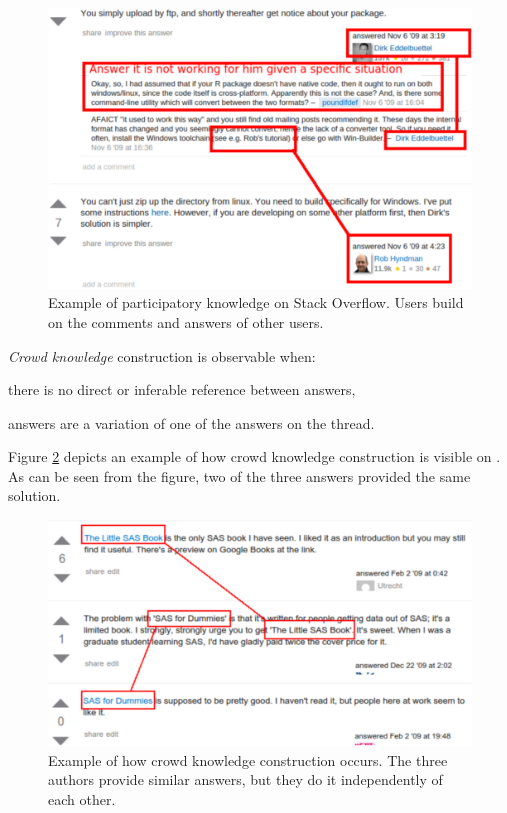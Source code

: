     \begin{figure}[!htb]
        \centering
        \includegraphics[width=\columnwidth]{Figures/SO-PKimg5}
        \caption{Example of participatory knowledge on Stack Overflow. Users build on the comments and answers of other users.}
        \label{fig:SO-PK1}
        \vspace{-3mm}
    \end{figure}

\textit{Crowd knowledge} construction is observable when:
  \begin{enumerate*}[label=(\arabic*)]
    \item there is no direct or inferable reference between answers,
    \item answers are a variation of one of the answers on the thread.
  \end{enumerate*}
Figure \ref{fig:CKC_MLSO} depicts an example of how crowd knowledge construction is visible on \SO. As can be seen from the figure, two of the three answers provided the same solution. 

    \begin{figure} [!htb]
        \centering
        \includegraphics[width=\columnwidth]{Figures/SO-CSimg2}
        \caption{Example of how crowd knowledge construction occurs. The three authors provide similar answers, but they do it independently of each other.}
        \label{fig:CKC_MLSO}
\vspace{-3mm}
    \end{figure}

